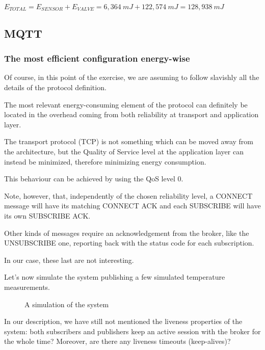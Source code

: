 \documentclass[a4paper,11pt]{article} %
\begin{document}
    \medskip

    $E_{TOTAL} = E_{SENSOR} + E_{VALVE} = 6,364\ mJ + 122,574\ mJ = 128,938\ mJ$

    \subsection{MQTT}\label{subsec:mqtt}

    \subsubsection{The most efficient configuration energy-wise}

    Of course, in this point of the exercise, we are assuming to follow slavishly all the details of the protocol definition.

    The most relevant energy-consuming element of the protocol can definitely be located in the overhead coming from both reliability at transport and application layer.

    The transport protocol (TCP) is not something which can be moved away from the architecture, but the Quality of Service level at the application layer can instead be minimized, therefore minimizing energy consumption.

    This behaviour can be achieved by using the QoS level 0.

    Note, however, that, independently of the chosen reliability level, a \textsc{CONNECT} message will have its matching \textsc{CONNECT ACK} and each \textsc{SUBSCRIBE} will have its own \textsc{SUBSCRIBE ACK}.

    Other kinds of messages require an acknowledgement from the broker, like the \textsc{UNSUBSCRIBE} one, reporting back with the status code for each subscription.

    In our case, these last are not interesting.

    Let's now simulate the system publishing a few simulated temperature measurements.

    \begin{figure}[H]
        \centering
        \caption{A simulation of the system}
        \label{fig:mqtt-wireshark}
    \end{figure}

    \label{liveness-mqtt}

    In our description, we have still not mentioned the liveness properties of the system: both subscribers and publishers keep an active session with the broker for the whole time?
    Moreover, are there any liveness timeouts (keep-alives)?
\end{document}
